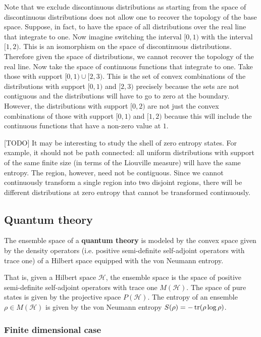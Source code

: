 Note that we exclude discontinuous distributions as starting from the space of discontinuous distributions does not allow one to recover the topology of the base space. Suppose, in fact, to have the space of all distributions over the real line that integrate to one. Now imagine switching the interval $[0, 1)$ with the interval $[1, 2)$. This is an isomorphism on the space of discontinuous distributions. Therefore given the space of distributions, we cannot recover the topology of the real line. Now take the space of continuous functions that integrate to one. Take those with support $[0,1) \cup [2,3)$. This is the set of convex combinations of the distributions with support $[0,1)$ and $[2,3)$ precisely because the sets are not contiguous and the distributions will have to go to zero at the boundary. However, the distributions with support $[0,2)$ are not just the convex combinations of those with support $[0,1)$ and $[1,2)$ because this will include the continuous functions that have a non-zero value at $1$.

[TODO] It may be interesting to study the shell of zero entropy states. For example, it should not be path connected: all uniform distributions with support of the same finite size (in terms of the Liouville measure) will have the same entropy. The region, however, need not be contiguous. Since we cannot continuously transform a single region into two disjoint regions, there will be different distributions at zero entropy that cannot be transformed continuously.


\subsection{Quantum theory}

\begin{defn}
	The ensemble space of a \textbf{quantum theory} is modeled by the convex space given by the density operators (i.e. positive semi-definite self-adjoint operators with trace one) of a Hilbert space equipped with the von Neumann entropy.
	
	That is, given a Hilbert space $\mathcal{H}$, the ensemble space is the space of positive semi-definite self-adjoint operators with trace one $M(\mathcal{H})$. The space of pure states is given by the projective space $P(\mathcal{H})$. The entropy of an ensemble $\rho \in M(\mathcal{H})$ is given by the von Neumann entropy $S(\rho) = -\operatorname{tr}(\rho \log \rho)$.
\end{defn}

\subsubsection{Finite dimensional case}

